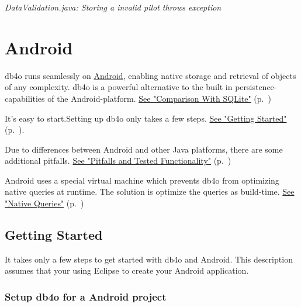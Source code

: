 {\small\itshape DataValidation.java: Storing a invalid pilot throws exception\par}
\medskip

\section{Android}
\label{ref:platform-specific-issues-android}

db4o runs seamlessly on \href{https://developer.android.com/}{Android}, enabling native storage and retrieval of objects of any complexity. db4o is a powerful alternative to the built in persistence-capabilities of the Android-platform. \hyperref[ref:platform-specific-issues-android-comparison-with-sqlite]{See "Comparison With SQLite"} (p.~\pageref{ref:platform-specific-issues-android-comparison-with-sqlite})

It's easy to start.Setting up db4o only takes a few steps. \hyperref[ref:platform-specific-issues-android-getting-started]{See "Getting Started"} (p.~\pageref{ref:platform-specific-issues-android-getting-started}).

Due to differences between Android and other Java platforms, there are some additional pitfalls. \hyperref[ref:platform-specific-issues-android-state-and-pitfalls]{See "Pitfalls and Tested Functionality"} (p.~\pageref{ref:platform-specific-issues-android-state-and-pitfalls})

Android uses a special virtual machine which prevents db4o from optimizing native queries at runtime. The solution is optimize the queries as build-time. \hyperref[ref:platform-specific-issues-android-native-queries]{See "Native Queries"} (p.~\pageref{ref:platform-specific-issues-android-native-queries})

\subsection{Getting Started}
\label{ref:platform-specific-issues-android-getting-started}

It takes only a few steps to get started with db4o and Android. This description assumes that your using Eclipse to create your Android application.

\subsubsection*{Setup db4o for a Android project}

